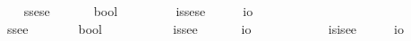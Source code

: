 \begin{isabellebody}
\ \ \isamarkupfalse%
\ ssese\ {\isacharequal}\ \ \ \ \ \ {\isachardoublequoteopen}{\isacharparenleft}{\isasymlangle}{\isasymzero}{\isasymrangle}{\isasymRightarrow}{\isasymlangle}{\isasymzero}{\isasymrangle}{\isasymRightarrow}bool{\isacharparenright}{\isachardoublequoteclose}\ \ \ \ \ {\isacharparenleft}{\isachardoublequoteopen}{\isasymlangle}{\isasymlangle}{\isasymzero}{\isasymrangle}{\isacharcomma}{\isasymlangle}{\isasymzero}{\isasymrangle}{\isasymrangle}{\isachardoublequoteclose}{\isacharparenright}\isanewline
\ \ \isamarkupfalse%
\ issese\ {\isacharequal}\ \ \ \ \ {\isachardoublequoteopen}{\isacharparenleft}{\isasymlangle}{\isasymzero}{\isasymrangle}{\isasymRightarrow}{\isasymlangle}{\isasymzero}{\isasymrangle}{\isasymRightarrow}io{\isacharparenright}{\isachardoublequoteclose}\ \ \ \ \ \ {\isacharparenleft}{\isachardoublequoteopen}{\isasymup}{\isasymlangle}{\isasymlangle}{\isasymzero}{\isasymrangle}{\isacharcomma}{\isasymlangle}{\isasymzero}{\isasymrangle}{\isasymrangle}{\isachardoublequoteclose}{\isacharparenright}\isanewline
\ \ \isamarkupfalse%
\ ssee\ {\isacharequal}\ \ \ \ \ \ \ {\isachardoublequoteopen}{\isacharparenleft}{\isasymlangle}{\isasymzero}{\isasymrangle}{\isasymRightarrow}{\isasymzero}{\isasymRightarrow}bool{\isacharparenright}{\isachardoublequoteclose}\ \ \ \ \ \ \ {\isacharparenleft}{\isachardoublequoteopen}{\isasymlangle}{\isasymlangle}{\isasymzero}{\isasymrangle}{\isacharcomma}{\isasymzero}{\isasymrangle}{\isachardoublequoteclose}{\isacharparenright}\isanewline
\ \ \isamarkupfalse%
\ issee\ {\isacharequal}\ \ \ \ \ \ {\isachardoublequoteopen}{\isacharparenleft}{\isasymlangle}{\isasymzero}{\isasymrangle}{\isasymRightarrow}{\isasymzero}{\isasymRightarrow}io{\isacharparenright}{\isachardoublequoteclose}\ \ \ \ \ \ \ \ {\isacharparenleft}{\isachardoublequoteopen}{\isasymup}{\isasymlangle}{\isasymlangle}{\isasymzero}{\isasymrangle}{\isacharcomma}{\isasymzero}{\isasymrangle}{\isachardoublequoteclose}{\isacharparenright}\isanewline
\ \ \isamarkupfalse%
\ isisee\ {\isacharequal}\ \ \ \ \ {\isachardoublequoteopen}{\isacharparenleft}{\isasymup}{\isasymlangle}{\isasymzero}{\isasymrangle}{\isasymRightarrow}{\isasymzero}{\isasymRightarrow}io{\isacharparenright}{\isachardoublequoteclose}\ \ \ \ \ \ {\isacharparenleft}{\isachardoublequoteopen}{\isasymup}{\isasymlangle}{\isasymup}{\isasymlangle}{\isasymzero}{\isasymrangle}{\isacharcomma}{\isasymzero}{\isasymrangle}{\isachardoublequoteclose}{\isacharparenright}\isanewline

\end{isabellebody}
